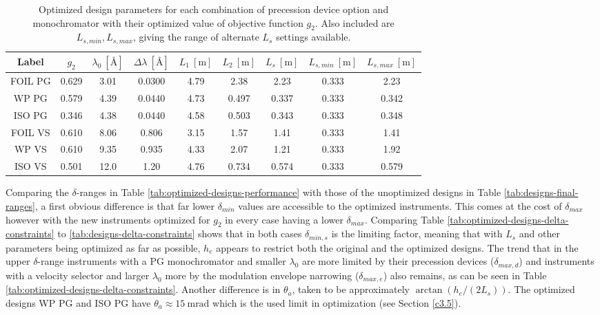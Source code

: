 \begin{table}[h!]
	\centering
	\begin{tabular}{c | c | c c c c c | c c}
		\toprule
		Label & $g_2$ & $\lambda_0 ~[\unit{\angstrom}]$ & $\Delta\lambda ~[\unit{\angstrom}]$ & $L_1 ~[\unit{\meter}]$ & $L_2 ~[\unit{\meter}]$ & $L_s  ~[\unit{\meter}]$ & $L_{s,min}  ~[\unit{\meter}]$& $L_{s, max}  ~[\unit{\meter}]$\\
		\midrule
		FOIL PG & \num{0.629} & \num{3.01} & \num{0.0300} & \num{4.79} & \num{2.38} & \num{2.23} & \num{0.333} & \num{2.23} \\
		WP PG & \num{0.579} & \num{4.39} & \num{0.0440} & \num{4.73} & \num{0.497} & \num{0.337} & \num{0.333} & \num{0.342} \\
		ISO PG & \num{0.346} & \num{4.38} & \num{0.0440} & \num{4.58} & \num{0.503} & \num{0.343} & \num{0.333} & \num{0.348} \\
		FOIL VS & \num{0.610} & \num{8.06} & \num{0.806} & \num{3.15} & \num{1.57} & \num{1.41} & \num{0.333} & \num{1.41} \\
		WP VS & \num{0.610} & \num{9.35} & \num{0.935} & \num{4.33} & \num{2.07} & \num{1.21} & \num{0.333} & \num{1.92} \\
		ISO VS & \num{0.501} & \num{12.0} & \num{1.20} & \num{4.76} & \num{0.734} & \num{0.574} & \num{0.333} & \num{0.579} \\
		\bottomrule
	\end{tabular}
	\caption{Optimized design parameters for each combination of precession device option and monochromator with their optimized value of objective function $g_2$. Also included are $L_{s,min}, L_{s,max}$, giving the range of alternate $L_s$ settings available.}
	\label{tab:optimized-designs}
\end{table}
Comparing the $\delta$-ranges in Table \ref{tab:optimized-designs-performance} with those of the unoptimized designs in Table \ref{tab:designs-final-ranges}, a first obvious difference is that far lower $\delta_{min}$ values are accessible to the optimized instruments. This comes at the cost of $\delta_{max}$ however with the new instruments optimized for $g_2$ in every case having a lower $\delta_{max}$. Comparing Table \ref{tab:optimized-designs-delta-constraints} to \ref{tab:designs-delta-constraints} shows that in both cases $\delta_{min,s}$ is the limiting factor, meaning that with $L_s$ and other parameters being optimized as far as possible, $h_e$ appears to restrict both the original and the optimized designs. The trend that in the upper $\delta$-range instruments with a PG monochromator and smaller $\lambda_0$ are more limited by their precession devices ($\delta_{max,d}$) and instruments with a velocity selector and larger $\lambda_0$ more by the modulation envelope narrowing ($\delta_{max,e}$) also remains, as can be seen in Table \ref{tab:optimized-designs-delta-constraints}. Another difference is in $\theta_a$, taken to be approximately $\arctan(h_e/(2L_s))$. The optimized designs WP PG and ISO PG have $\theta_a \approx \SI{15}{\milli\radian}$ which is the used limit in optimization (see Section \ref{c3.5}).

